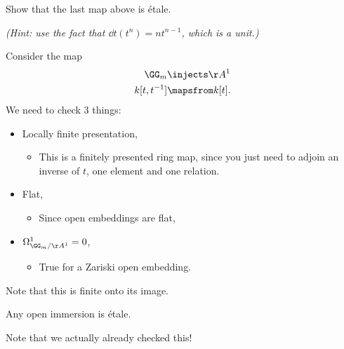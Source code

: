 \begin{exercise}[?]

Show that the last map above is étale.

\emph{(Hint: use the fact that \(\dd{}{t} (t^n) = nt^{n-1}\), which is a
unit.)}

\end{exercise}

\begin{example}[?]

Consider the map
\begin{align*}  
\GG_m &\injects \AA^1 \\
k[t, t^{-1}] &\mapsfrom k[t]
.\end{align*} We need to check 3 things:

\begin{itemize}
\tightlist
\item
  Locally finite presentation,

  \begin{itemize}
  \tightlist
  \item
    This is a finitely presented ring map, since you just need to adjoin
    an inverse of \(t\), one element and one relation.
  \end{itemize}
\item
  Flat,

  \begin{itemize}
  \tightlist
  \item
    Since open embeddings are flat,
  \end{itemize}
\item
  \(\Omega^1_{\GG_m / \AA^1} = 0\),

  \begin{itemize}
  \tightlist
  \item
    True for a Zariski open embedding.
  \end{itemize}
\end{itemize}

Note that this is finite onto its image.

\end{example}

\begin{proposition}[?]

Any open immersion is étale.

\end{proposition}

Note that we actually already checked this!

